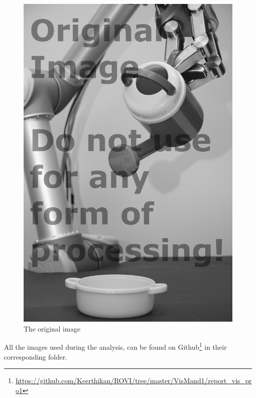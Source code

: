 \begin{figure}[H]
\centering
        \includegraphics[scale= 0.14]{org.png}
        \caption{The original image}
        \label{fig:orignal}
\end{figure}

All the images used during the analysis, can be found on Github\footnote{\url{https://github.com/Keerthikan/ROVI/tree/master/VisMand1/report_vis_pro1}} in their corresponding folder. 
 


